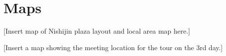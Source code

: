 \section{Maps}
[Insert map of Nishijin plaza layout and local area map here.]

[Insert a map showing the meeting location for the tour on the 3rd day.] %
